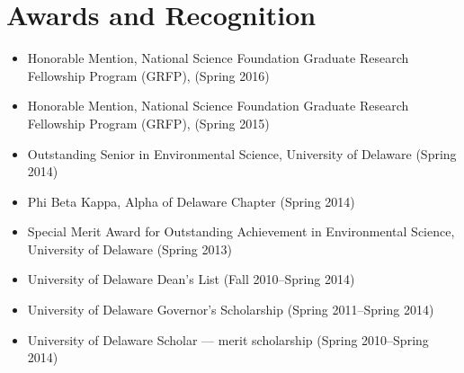 \section*{Awards and Recognition}

\begin{itemize}
  \item Honorable Mention, National Science Foundation Graduate Research Fellowship Program (GRFP), (Spring 2016)
  \item Honorable Mention, National Science Foundation Graduate Research Fellowship Program (GRFP), (Spring 2015)
  \item Outstanding Senior in Environmental Science, University of Delaware (Spring 2014)
  \item Phi Beta Kappa, Alpha of Delaware Chapter (Spring 2014)
  \item Special Merit Award for Outstanding Achievement in Environmental Science, University of Delaware (Spring 2013)
  \item University of Delaware Dean's List (Fall 2010--Spring 2014)
  \item University of Delaware Governor's Scholarship (Spring 2011--Spring 2014)
  \item University of Delaware Scholar --- merit scholarship (Spring 2010--Spring 2014)
\end{itemize}

